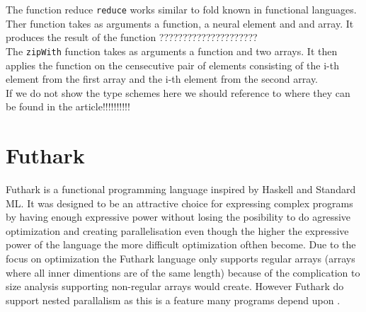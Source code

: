 \documentclass[11pt]{article}
\begin{document}
The function reduce {\tt reduce} works similar to fold known in functional languages. Ther function takes as arguments a function, a neural element and and array. It produces the result of the function ????????????????????? \\
The {\tt zipWith} function takes as arguments a function and two arrays. It then applies the function on the censecutive pair of elements consisting of the i-th element from the first array and the i-th element from the second array. \\

If we do not show the type schemes here we should reference to where they can be found in the article!!!!!!!!!!




 


\section{Futhark}

Futhark is a functional programming language inspired by Haskell and Standard ML.
It was designed to be an attractive choice for expressing complex programs by having enough expressive power without
losing the posibility to do agressive optimization and creating parallelisation even though the higher the expressive power of the
language the more difficult optimization ofthen become.
Due to the focus on optimization the Futhark language only supports regular arrays (arrays where all inner dimentions are of the same length)
because of the complication to size analysis supporting non-regular arrays would create.
However Futhark do support nested parallalism as this is a feature many programs 
depend upon \cite{TroelsHenriksen}.\\
\end{document}
